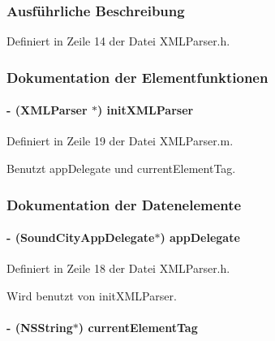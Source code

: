 \subsubsection{Ausführliche Beschreibung}


Definiert in Zeile 14 der Datei XMLParser.h.

\subsubsection{Dokumentation der Elementfunktionen}
\hypertarget{interface_x_m_l_parser_a04ecc0246851bd683dc7eadbf98f5771}{
\paragraph[{initXMLParser}]{\setlength{\rightskip}{0pt plus 5cm}-\/ ({\bf XMLParser} $\ast$) initXMLParser }\hfill}
\label{interface_x_m_l_parser_a04ecc0246851bd683dc7eadbf98f5771}


Definiert in Zeile 19 der Datei XMLParser.m.

Benutzt appDelegate und currentElementTag.

\subsubsection{Dokumentation der Datenelemente}
\hypertarget{interface_x_m_l_parser_a51da78288f2a6e119a96f273b24d4fc8}{
\paragraph[{appDelegate}]{\setlength{\rightskip}{0pt plus 5cm}-\/ ({\bf SoundCityAppDelegate}$\ast$) {\bf appDelegate}}\hfill}
\label{interface_x_m_l_parser_a51da78288f2a6e119a96f273b24d4fc8}


Definiert in Zeile 18 der Datei XMLParser.h.

Wird benutzt von initXMLParser.\hypertarget{interface_x_m_l_parser_a5a17b627330be2bd38d3d5ad5880e0cc}{
\paragraph[{currentElementTag}]{\setlength{\rightskip}{0pt plus 5cm}-\/ (NSString$\ast$) {\bf currentElementTag}}\hfill}
\label{interface_x_m_l_parser_a5a17b627330be2bd38d3d5ad5880e0cc}



